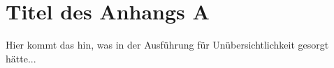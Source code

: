 \chapter{Titel des Anhangs A}
\label{Anhang_A}
% 
Hier kommt das hin, was in der Ausführung für Unübersichtlichkeit gesorgt
hätte...
